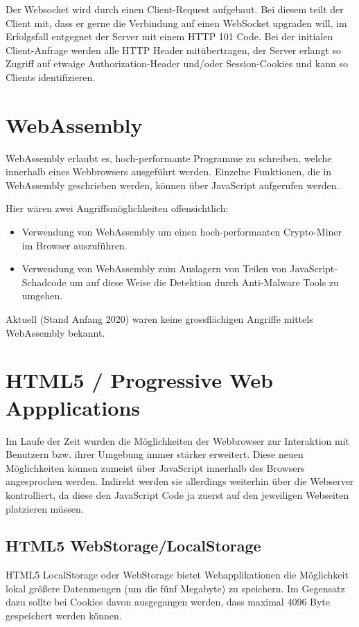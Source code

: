 Der Websocket wird durch einen Client-Request aufgebaut. Bei diesem teilt der Client mit, dass er gerne die Verbindung auf einen WebSocket upgraden will, im Erfolgsfall entgegnet der Server mit einem HTTP 101 Code. Bei der initialen Client-Anfrage werden alle HTTP Header mitübertragen, der Server erlangt so Zugriff auf etwaige Authorization-Header und/oder Session-Cookies und kann so Clients identifizieren.

\section{WebAssembly}

WebAssembly erlaubt es, hoch-performante Programme zu schreiben, welche innerhalb eines Webbrowsers ausgeführt werden. Einzelne Funktionen, die in WebAssembly geschrieben werden, können über JavaScript aufgerufen werden.

Hier wären zwei Angriffsmöglichkeiten offensichtlich:

\begin{itemize}
	\item Verwendung von WebAssembly um einen hoch-performanten Crypto-Miner im Browser auszuführen.
	\item Verwendung von WebAssembly zum Auslagern von Teilen von JavaScript-Schadcode um auf diese Weise die Detektion durch Anti-Malware Tools zu umgehen.
\end{itemize}

Aktuell (Stand Anfang 2020) waren keine grossflächigen Angriffe mittels WebAssembly bekannt.

\section{HTML5 / Progressive Web Appplications}

Im Laufe der Zeit wurden die Möglichkeiten der Webbrowser zur Interaktion mit Benutzern bzw. ihrer Umgebung immer stärker erweitert. Diese neuen Möglichkeiten können zumeist über JavaScript innerhalb des Browsers angesprochen werden. Indirekt werden sie allerdings weiterhin über die Webserver kontrolliert, da diese den JavaScript Code ja zuerst auf den jeweiligen Webseiten platzieren müssen.

\subsection{HTML5 WebStorage/LocalStorage}

HTML5 LocalStorage oder WebStorage bietet Webapplikationen die Möglichkeit lokal größere Datenmengen (um die fünf Megabyte) zu speichern. Im Gegensatz dazu sollte bei Cookies davon ausgegangen werden, dass maximal 4096 Byte gespeichert werden können.

